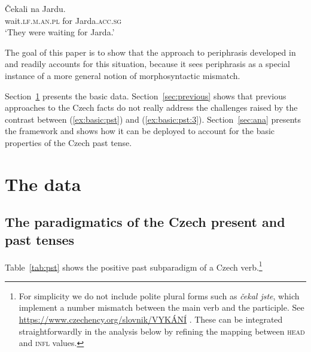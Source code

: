\documentclass[output=paper]{langsci/langscibook}
\begin{document}
\begin{exe}
\ex\label{ex:basic:pst:3}\gll Čekali  na Jardu.\\ 
wait.\textsc{lf.m.an.pl}  for Jarda.\textsc{acc.sg}\\
\glt ‘They were waiting for Jarda.’
\end{exe}

The goal of this paper is to show that the approach to periphrasis developed in \citet{Bonami14d} and \citet{Bonami16b} readily accounts for this situation, because it sees periphrasis as a special instance of a more general notion of morphosyntactic mismatch.

Section~\ref{sec:data} presents the basic data. Section~\ref{sec:previous} shows that previous approaches to the Czech facts do not really address the challenges raised by the contrast between (\ref{ex:basic:pst}) and (\ref{ex:basic:pst:3}). Section~\ref{sec:ana} presents the framework and shows how it can be deployed to account for the basic properties of the Czech past tense.



\section{The  data}
\label{sec:data}

\subsection{The paradigmatics of the Czech present and past tenses}

Table~\ref{tab:pst} shows the positive past subparadigm of a Czech verb.\footnote{For simplicity we do not include polite plural forms such as \emph{\v{c}ekal jste}, which implement a number mismatch between the main verb and the participle. See \url{https://www.czechency.org/slovnik/VYKÁNÍ} \citep{Karlik16}. These can be integrated straightforwardly in the analysis below by refining the mapping between \textsc{head} and \textsc{infl} values.}
\end{document}
